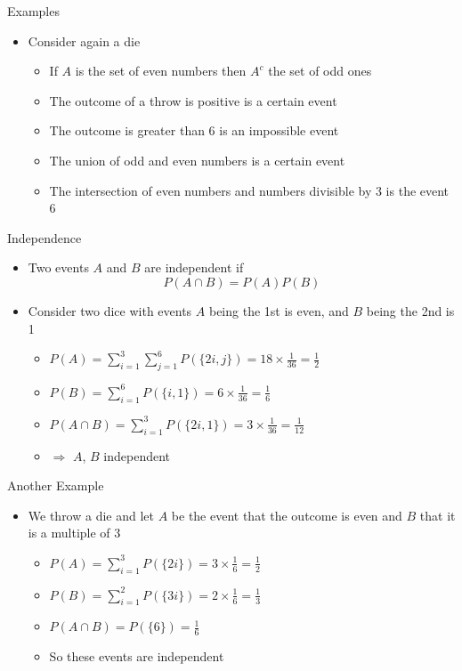 \documentclass{beamer}
\begin{document}
\begin{frame}{Examples} 
\begin{itemize} 
 \item Consider again a die
\begin{itemize}
\item If $A$ is the set of even numbers then $A^c$ the set of odd ones
\item The outcome of a throw is positive is a certain event 
\item The outcome is greater than 6 is an impossible event 
\item The union of odd and even numbers is a certain event 
\item The intersection of even numbers and numbers divisible by 3 is the event ${6}$
\end{itemize}
 \end{itemize}
\end{frame}

\begin{frame}{Independence} 
\begin{itemize}
 \item Two events $A$ and $B$ are independent if 
\begin{displaymath} 
 P(A \cap B) = P(A)P(B)
\end{displaymath}
\item Consider two dice with events $A$ being the 1st is even, and $B$ being the 2nd is 1
\begin{itemize}
\item $P(A) = \sum_{i=1}^3 \sum_{j=1}^6 P(\{2i, j\}) = 18 \times \frac{1}{36} = \frac{1}{2}$
\item $P(B) =  \sum_{i=1}^6 P(\{i, 1\}) = 6 \times \frac{1}{36} = \frac{1}{6}$
\item $P(A \cap B) = \sum_{i=1}^3 P(\{2i, 1\}) = 3 \times \frac{1}{36}  = \frac{1}{12}$ 
\item $\Rightarrow$ $A$, $B$ independent 
\end{itemize}
\end{itemize}
\end{frame}

\begin{frame}{Another Example}  
 \begin{itemize}
  \item We throw a die and let $A$ be the event that the outcome is even and $B$ that it is a multiple of 3
\begin{itemize}
\item $P(A) = \sum_{i=1}^3 P(\{2i\}) = 3 \times \frac{1}{6} = \frac{1}{2}$ 
\item $P(B) = \sum_{i=1}^2 P(\{3i\}) = 2 \times \frac{1}{6} = \frac{1}{3}$ 
\item $P(A \cap B) = P(\{6\}) = \frac{1}{6}$ 
\item So these events are independent 
 \end{itemize}
 \end{itemize}
\end{frame}
\end{document}
